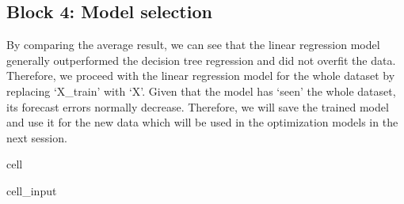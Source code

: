 \documentclass[letterpaper,10pt,english]{jupyterBook}
\begin{document}
\subsection{Block 4: Model selection}
\label{\detokenize{docs/Case1_2_Module1A_Retail_Demand_Model:block-4-model-selection}}
\sphinxAtStartPar
By comparing the average result, we can see that the linear regression model generally outperformed the decision tree regression and did not overfit the data. Therefore, we proceed with the linear regression model for the whole dataset by replacing ‘X\_train’ with ‘X’. Given that the model has ‘seen’ the whole dataset, its forecast errors normally decrease. Therefore, we will save the trained model and use it for the new data which will be used in the optimization models in the next session.

\begin{sphinxuseclass}{cell}\begin{sphinxVerbatimInput}

\begin{sphinxuseclass}{cell_input}
\begin{sphinxVerbatim}[commandchars=\\\{\}]
  
  \PYG{p}{[} \PYG{p}{]}   


\end{sphinxVerbatim}
\end{sphinxuseclass}
\end{sphinxVerbatimInput}
\end{sphinxuseclass}
\end{document}
